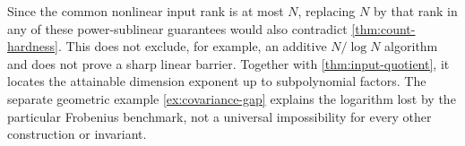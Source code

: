 Since the common nonlinear input rank is at most $N$, replacing $N$
by that rank in any of these power-sublinear guarantees would also
contradict \cref{thm:count-hardness}. This does not exclude, for example,
an additive $N/\log N$ algorithm and does not prove a sharp linear
barrier. Together with \cref{thm:input-quotient}, it locates the attainable
dimension exponent up to subpolynomial factors. The separate geometric
example \cref{ex:covariance-gap} explains the logarithm lost by the
particular Frobenius benchmark, not a universal impossibility for every
other construction or invariant.
